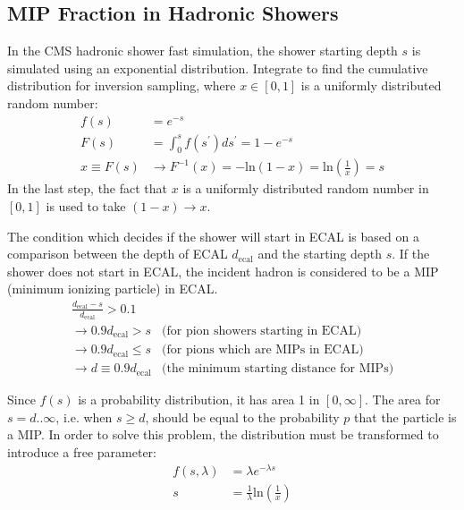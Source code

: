 \subsection{MIP Fraction in Hadronic Showers}

In the CMS hadronic shower fast simulation, the shower starting depth $s$ is simulated using an exponential distribution. Integrate to find the cumulative distribution for inversion sampling, where $x \in [0,1]$ is a uniformly distributed random number:
\begin{align}
f(s) &= e^{-s}\\
F(s) &= \int_{0}^{s} f(s^{\prime})ds^{\prime} = 1 - e^{-s}\\
x \equiv F(s) &\rightarrow F^{-1}(x) = -\text{ln}(1-x) = \text{ln}\left(\frac{1}{x}\right) = s
\end{align}
In the last step, the fact that $x$ is a uniformly distributed random number in $[0,1]$ is used to take $(1-x) \rightarrow x$.

The condition which decides if the shower will start in ECAL is based on a comparison between the depth of ECAL $d_{\text{ecal}}$ and the starting depth $s$. If the shower does not start in ECAL, the incident hadron is considered to be a MIP (minimum ionizing particle) in ECAL.
\begin{align}
\frac{d_{\text{ecal}}-s}{d_{\text{ecal}}} > 0.1 &\\
\rightarrow 0.9 d_{\text{ecal}} > s &\text{(for pion showers starting in ECAL)} \\
\rightarrow 0.9 d_{\text{ecal}} \leq s &\text{(for pions which are MIPs in ECAL)} \\
\rightarrow d \equiv 0.9 d_{\text{ecal}} &\text{(the minimum starting distance for MIPs)}
\end{align}

Since $f(s)$ is a probability distribution, it has area 1 in $[0,\infty]$. The area for $s = d..\infty$, i.e. when $s \geq d$, should be equal to the probability $p$ that the particle is a MIP. In order to solve this problem, the distribution must be transformed to introduce a free parameter:
\begin{align}
f(s,\lambda) &= \lambda e^{-\lambda s}\\
s &= \frac{1}{\lambda}\text{ln}\left(\frac{1}{x}\right)
\end{align}

